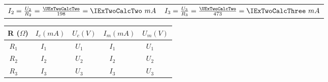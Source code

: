 \documentclass{article}
\begin{document}

			\begin{center} \begin{tabular}{c|c}
				\(I_2 = \frac{U_2}{R_2} = \frac{\UExTwoCalcTwo}{\RTwo} = \IExTwoCalcTwo \ mA\)
				&
				\(I_3 = \frac{U_3}{R_3} = \frac{\UExTwoCalcTwo}{\RMax} = \IExTwoCalcThree \ mA\)\\
			\end{tabular} \end{center}

			\begin{center} \begin{tabular}{|c|c|c|c|c|c|c|c|c|c|}
				\hline
					\multicolumn{2}{|c|}{R ($\Omega$)} &
					\multicolumn{2}{c|}{$I_c (mA)$} &
					\multicolumn{2}{c|}{$U_c (V)$} &
					\multicolumn{2}{c|}{$I_m (mA)$} &
					\multicolumn{2}{c|}{$U_m (V)$}\\
				\hline

				$R_1$ & \ROne & $I_1$ & \IExTwoCalcOne & $U_1$ & \UExTwoCalcOne & $I_1$ & \IExTwoOne & $U_1$ & \UExTwoOne\\
				\hline

				$R_2$ & \RTwo & $I_2$ & \IExTwoCalcTwo & $U_2$ & \UExTwoCalcTwo & $I_2$ & \IExTwoTwo & $U_2$ & \UExTwoTwo\\
				\hline

				$R_3$ & \RMax & $I_3$ & \IExTwoCalcThree & $U_3$ & \UExTwoCalcTwo & $I_3$ & \IExTwoThree & $U_3$ & \UExTwoThree\\
				\hline
			\end{tabular} \end{center}
		
		\subsection{}
\end{document}
